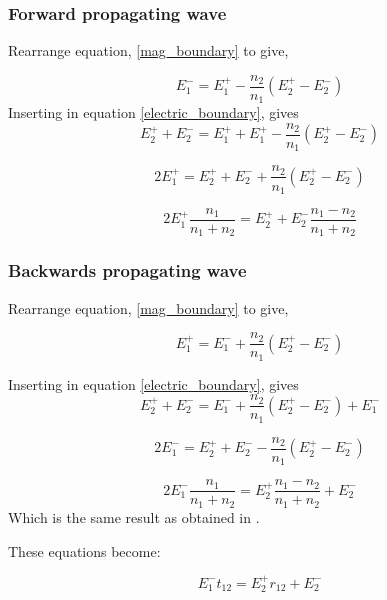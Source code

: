 \documentclass[11pt]{article}
\begin{document}
\subsubsection{Forward propagating wave}
Rearrange equation, \ref{mag_boundary} to give,

\begin{equation}
E_{1}^{-} = E_{1}^{+}-\frac{n_2}{n_1}(E_{2}^{+}-E_{2}^{-})
\end{equation}
Inserting in equation \ref{electric_boundary}, gives 
\begin{equation}
E_{2}^{+}+E_{2}^{-}=E_{1}^{+}+E_{1}^{+}-\frac{n_2}{n_1}(E_{2}^{+}-E_{2}^{-})
\end{equation}

\begin{equation}
2E_{1}^{+}=E_{2}^{+}+E_{2}^{-}+\frac{n_2}{n_1}(E_{2}^{+}-E_{2}^{-})
\end{equation}

\begin{equation}
2E_{1}^{+}\frac{n_1}{n_1+n_2}=E_{2}^{+}+E_{2}^{-}\frac{n_1-n_2}{n_1+n_2}
\end{equation}

\subsubsection{Backwards propagating wave}
Rearrange equation, \ref{mag_boundary} to give,

\begin{equation}
E_{1}^{+}=E_{1}^{-} +\frac{n_2}{n_1}(E_{2}^{+}-E_{2}^{-})
\end{equation}

Inserting in equation \ref{electric_boundary}, gives 
\begin{equation}
E_{2}^{+}+E_{2}^{-}=E_{1}^{-} +\frac{n_2}{n_1}(E_{2}^{+}-E_{2}^{-})+E_{1}^{-}
\end{equation}

\begin{equation}
2E_{1}^{-}=E_{2}^{+}+E_{2}^{-}- \frac{n_2}{n_1}(E_{2}^{+}-E_{2}^{-})
\end{equation}

\begin{equation}
2E_{1}^{-}\frac{n_1}{n_1+n_2}=E_{2}^{+}\frac{n_1-n_2}{n_1+n_2}+E_{2}^{-}
\end{equation}
Which is the same result as obtained in \cite{10.1063/1.1534621}.

These equations become:

\begin{equation}
E_{1}^{-}t_{12}=E_{2}^{+}r_{12}+E_{2}^{-}
\end{equation}
\end{document}
